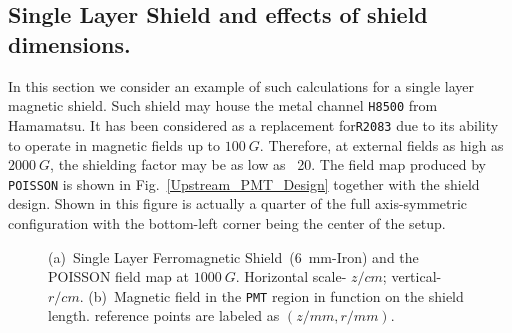 \documentclass[12pt]{article}
\begin{document}
\subsection{Single Layer Shield and effects of  shield dimensions.}
\label{emsdimen}
In this section  we consider an example of such calculations for
a single layer magnetic shield. Such shield may house   
the metal channel {\tt H8500} from Hamamatsu.
It  has been  considered as a replacement for{\tt R2083}   due to its 
ability to operate in magnetic fields up to $100~G$.
Therefore, at external fields as high as $2000~G$, the shielding factor may be as low as ~20.
The  field map  produced by {\tt POISSON}  is  
shown in Fig.~\ref{Upstream_PMT_Design} together with  the shield design. 
Shown in this figure is actually  a quarter of the full axis-symmetric configuration
with the bottom-left corner being the center of the setup. 
%
\begin{figure}[htbp]%
\centering
{}
\qquad
{}
\caption{\small{
(a)~Single Layer Ferromagnetic Shield~(6~mm-Iron) and the  POISSON field map at $1000~G$.
 Horizontal scale- $z/cm$; vertical- $r/cm$.
(b)~Magnetic field in the  {\tt PMT} region in function on the shield length.
reference points are labeled as $(z/mm,r/mm)$.}}
\label{Upstream_Iron_6mm_PMT_Region}
\end{figure}
\end{document}
